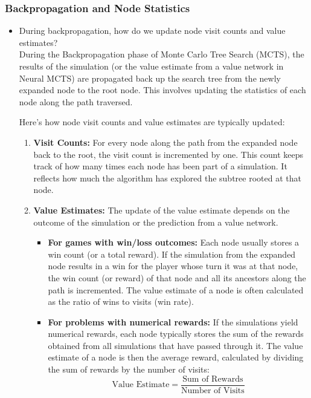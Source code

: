 \subsubsection{Backpropagation and Node Statistics}
\begin{itemize}
    \item During backpropagation, how do we update node visit counts and value estimates?  \\
    During the Backpropagation phase of Monte Carlo Tree Search (MCTS), the results of the simulation (or the value estimate from a value network in Neural MCTS) are propagated back up the search tree from the newly expanded node to the root node. This involves updating the statistics of each node along the path traversed.

Here's how node visit counts and value estimates are typically updated:

\begin{enumerate}
    \item \textbf{Visit Counts:} For every node along the path from the expanded node back to the root, the visit count is incremented by one. This count keeps track of how many times each node has been part of a simulation. It reflects how much the algorithm has explored the subtree rooted at that node.
    \item \textbf{Value Estimates:} The update of the value estimate depends on the outcome of the simulation or the prediction from a value network.
    \begin{itemize}
        \item \textbf{For games with win/loss outcomes:} Each node usually stores a win count (or a total reward). If the simulation from the expanded node results in a win for the player whose turn it was at that node, the win count (or reward) of that node and all its ancestors along the path is incremented. The value estimate of a node is often calculated as the ratio of wins to visits (win rate).
        \item \textbf{For problems with numerical rewards:} If the simulations yield numerical rewards, each node typically stores the sum of the rewards obtained from all simulations that have passed through it. The value estimate of a node is then the average reward, calculated by dividing the sum of rewards by the number of visits:
        $$ \text{Value Estimate} = \frac{\text{Sum of Rewards}}{\text{Number of Visits}} $$
    \end{itemize}
\end{enumerate}


\end{itemize}

